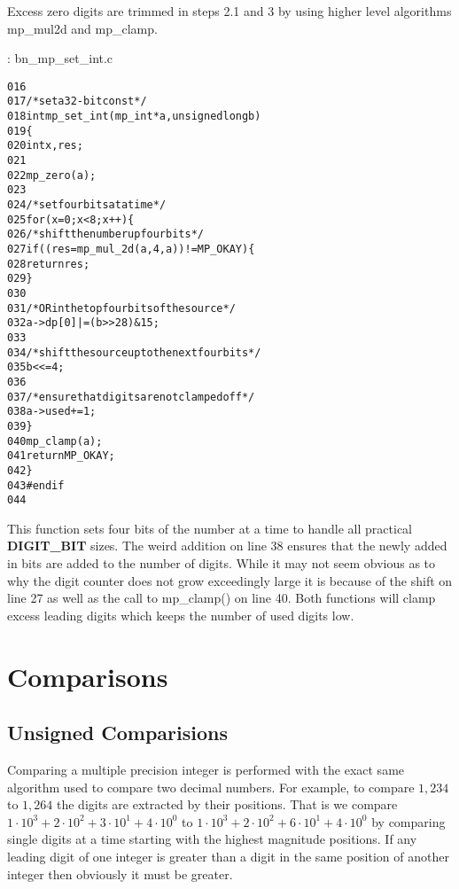 \documentclass[b5paper]{book}
\begin{document}
Excess zero digits are trimmed in steps 2.1 and 3 by using higher level algorithms mp\_mul2d and mp\_clamp.

\vspace{+3mm}\begin{small}
\hspace{-5.1mm}{\bf File}: bn\_mp\_set\_int.c
\vspace{-3mm}
\begin{alltt}
016   
017   /* set a 32-bit const */
018   int mp_set_int (mp_int * a, unsigned long b)
019   \{
020     int     x, res;
021   
022     mp_zero (a);
023     
024     /* set four bits at a time */
025     for (x = 0; x < 8; x++) \{
026       /* shift the number up four bits */
027       if ((res = mp_mul_2d (a, 4, a)) != MP_OKAY) \{
028         return res;
029       \}
030   
031       /* OR in the top four bits of the source */
032       a->dp[0] |= (b >> 28) & 15;
033   
034       /* shift the source up to the next four bits */
035       b <<= 4;
036   
037       /* ensure that digits are not clamped off */
038       a->used += 1;
039     \}
040     mp_clamp (a);
041     return MP_OKAY;
042   \}
043   #endif
044   
\end{alltt}
\end{small}

This function sets four bits of the number at a time to handle all practical \textbf{DIGIT\_BIT} sizes.  The weird
addition on line 38 ensures that the newly added in bits are added to the number of digits.  While it may not 
seem obvious as to why the digit counter does not grow exceedingly large it is because of the shift on line 27 
as well as the  call to mp\_clamp() on line 40.  Both functions will clamp excess leading digits which keeps 
the number of used digits low.

\section{Comparisons}
\subsection{Unsigned Comparisions}
Comparing a multiple precision integer is performed with the exact same algorithm used to compare two decimal numbers.  For example,
to compare $1,234$ to $1,264$ the digits are extracted by their positions.  That is we compare $1 \cdot 10^3 + 2 \cdot 10^2 + 3 \cdot 10^1 + 4 \cdot 10^0$
to $1 \cdot 10^3 + 2 \cdot 10^2 + 6 \cdot 10^1 + 4 \cdot 10^0$ by comparing single digits at a time starting with the highest magnitude 
positions.  If any leading digit of one integer is greater than a digit in the same position of another integer then obviously it must be greater.  
\end{document}
